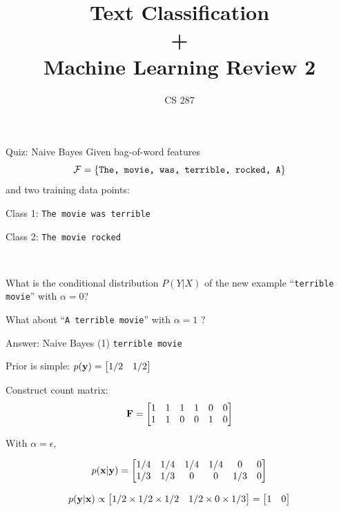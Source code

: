 \documentclass{beamer}
\title{Text Classification\\ + \\ Machine Learning Review 2 }
\date{}
\author{CS 287}
\begin{document}
\begin{frame}
  \titlepage
\end{frame}



\begin{frame}{Quiz: Naive Bayes}
  Given bag-of-word features \[\mathcal{F} = \{\mathrm{\texttt{The, movie, was, terrible, rocked, A}} \}\] and two training data points:
    
  \begin{center}
    Class 1: \texttt{The movie was terrible}
  
    Class 2: \texttt{The movie rocked}
  \end{center}
  \\

  \air 

  What is the conditional distribution $P(Y | X)$ of the new example ``\texttt{terrible movie}''  with $\alpha =0$?
  \air 

  What about ``\texttt{A terrible movie}'' with $\alpha =1$ ?
\end{frame}

\begin{frame}{Answer: Naive Bayes (1) }
  \texttt{terrible movie}
  \air 

  Prior is simple: $p(\mathbf{y}) =  \begin{bmatrix} 1/2 & 1/2 \end{bmatrix}$  

  Construct count matrix:
  \[ \mathbf{F} =
    \begin{bmatrix}
      1 & 1 & 1 & 1 & 0 & 0 \\
      1 & 1 & 0 & 0 & 1 & 0 \\
    \end{bmatrix}
  \] 
  
  With $\alpha = \epsilon$,

  \[ p(\mathbf{x} | \mathbf{y}) =     \begin{bmatrix}
      1/4 & 1/4 & 1/4 & 1/4 & 0 & 0 \\
      1/3 & 1/3 & 0 & 0 & 1/3 & 0 \\
    \end{bmatrix} 
  \]

  \[ p(\mathbf{y} | \mathbf{x}) \propto \begin{bmatrix} 1/2 \times 1/2 \times 1/2 &  1/2 \times 0 \times 1/3  \end{bmatrix} = \begin{bmatrix} 1 &  0 \end{bmatrix}  \]

\end{frame}
  
\end{document}
